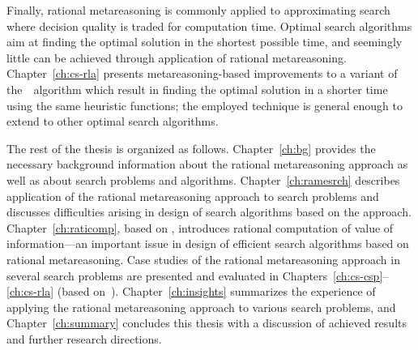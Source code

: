 Finally, rational metareasoning is commonly applied to approximating
search where decision quality is traded for computation time. Optimal
search algorithms aim at finding the optimal solution in the shortest
possible time, and seemingly little can be achieved through
application of rational metareasoning.  Chapter~\ref{ch:cs-rla}
presents metareasoning-based improvements to a variant of
the~\astar~algorithm which result in finding the optimal solution in a
shorter time using the same heuristic functions; the employed
technique is general enough to extend to other optimal
search algorithms.

The rest of the thesis is organized as follows. Chapter~\ref{ch:bg}
provides the necessary background information about the rational
metareasoning approach as well as about search problems and
algorithms. Chapter~\ref{ch:ramesrch} describes application of the
rational metareasoning approach to search problems and discusses
difficulties arising in design of search algorithms based on the
approach. Chapter~\ref{ch:raticomp}, based
on \cite{TolpinShimony.raticomp}, introduces rational computation of
value of information---an important issue in design of efficient
search algorithms based on rational metareasoning. Case studies of the
rational metareasoning approach in several search problems are
presented and evaluated in Chapters~\ref{ch:cs-csp}--\ref{ch:cs-rla} (based
on~\cite{TolpinShimony.csp,TolpinShimony.mcts,HayRussellTolpinShimony.selecting,TolpinEtAl.rla}).
Chapter~\ref{ch:insights} summarizes the experience of applying 
the rational metareasoning approach to various search problems, and
Chapter~\ref{ch:summary} concludes this thesis with a discussion of
achieved results and further research directions.

